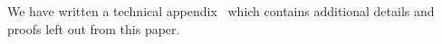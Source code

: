 \documentclass[format=acmsmall, review=true, screen=true]{acmart}
\begin{document}
We have written a technical appendix~\citep{technical_appendix} which contains
additional details and proofs left out from this paper.





\end{document}
